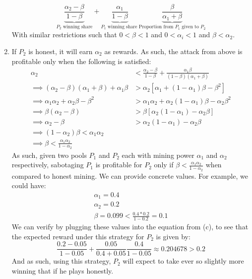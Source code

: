 \documentclass[12pt]{exam}
\begin{document}
\begin{questions}
\begin{solution}
\begin{enumerate}[label=\textbf{\alph*.}]
      \[
        \underbrace{\frac{\alpha_2 - \beta}{1 - \beta}}_{P_2\text{ winning share}} + \underbrace{\frac{\alpha_1}{1 - \beta}}_{P_1\text{ winning share }}\underbrace{\frac{\beta}{\alpha_1 + \beta}}_{\text{Proportion from }P_1 \text{ given to }P_2}
      \]
      With similar restrictions such that $0 < \beta < 1$ and $0 < \alpha_i < 1$ and $\beta < \alpha_2$.
      \item
        If $P_2$ is honest, it will earn $\alpha_2$ as rewards. As such, the attack from above is profitable only when the following is satisfied:
        \begin{align*}
          \alpha_2 &< \frac{\alpha_2 - \beta}{1 - \beta} + \frac{\alpha_1 \beta}{(1 - \beta)(\alpha_1 + \beta)} \\ 
          \implies (\alpha_2 - \beta)(\alpha_1 + \beta) + \alpha_1\beta &> \alpha_2[\alpha_1 + (1 - \alpha_1)\beta  - \beta^2] \tag{Multiply through by $(1-\beta)(\alpha_1 + \beta)$} \\
          \implies \alpha_1\alpha_2 + \alpha_2\beta - \beta^2 &> \alpha_1\alpha_2 + \alpha_2(1-\alpha_1)\beta - \alpha_2\beta^2 \tag{Expanding terms} \\
          \implies \beta(\alpha_2 - \beta) &> \beta[\alpha_2(1 - \alpha_1) - \alpha_2\beta] \tag{Simplify} \\
          \implies \alpha_2 - \beta &> \alpha_2(1-\alpha_1) - \alpha_2 \beta \tag{$\beta \neq 0$} \\
          \implies (1 - \alpha_2) \beta < \alpha_1\alpha_2 \\
          \implies \beta < \frac{\alpha_1\alpha_2}{1-\alpha_2}
        \end{align*}
        As such, given two pools $P_1$ and $P_2$ each with mining power $\alpha_1$ and $\alpha_2$ respectively, sabotaging $P_1$ is profitable for $P_2$ only if $\beta < \frac{\alpha_1\alpha_2}{1 - \alpha_2}$ when compared to honest mining. We can provide concrete values. For example, we could have:
        \begin{align*}
          \alpha_1 = 0.4 \\
          \alpha_2 = 0.2 \\
          \beta = 0.099 < \frac{0.4 * 0.2}{1 - 0.2} = 0.1
        \end{align*}
        We can verify by plugging these values into the equation from (c), to see that the expected reward under this strategy for $P_2$ is given by:
        \[
          \frac{0.2 - 0.05}{1 - 0.05} + \frac{0.05}{0.4 + 0.05}\frac{0.4}{1 - 0.05} \approx 0.204678 > 0.2
        \]
        And as such, using this strategy, $P_2$ will expect to take ever so slightly more winning that if he plays honestly.
  \end{enumerate}
\end{solution}


\end{questions}
\end{document}
